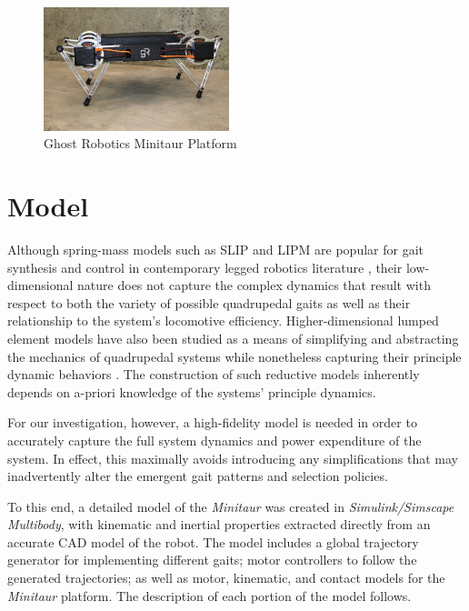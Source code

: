 \documentclass[conference,11pt,letterpaper]{IEEEtran}
\begin{document}
\begin{figure}[ht!]
    \centering
    \includegraphics[width=0.48\textwidth]{grminitaur}
    \caption{Ghost Robotics Minitaur Platform \autocite{grminitaur}}
    \label{fig:grminitaur}
\end{figure}

\section{Model}



Although spring-mass models such as SLIP and LIPM are popular for gait synthesis and control in contemporary legged robotics literature \autocite{albertwuhartmutgeyer2013}, their low-dimensional nature does not capture the complex dynamics that result with respect to both the variety of possible quadrupedal gaits as well as their relationship to the system's locomotive efficiency. Higher-dimensional lumped element models have also been studied as a means of simplifying and abstracting the mechanics of quadrupedal systems while nonetheless capturing their principle dynamic behaviors \autocite{remy2011optimal}. The construction of such reductive models inherently depends on a-priori knowledge of the systems' principle dynamics.

For our investigation, however, a high-fidelity model is needed in order to accurately capture the full system dynamics and power expenditure of the system. In effect, this maximally avoids introducing any simplifications that may inadvertently alter the emergent gait patterns and selection policies.

To this end, a detailed model of the \emph{Minitaur} was created in \emph{Simulink/Simscape Multibody}, with kinematic and inertial properties extracted directly from an accurate CAD model of the robot. The model includes a global trajectory generator for implementing different gaits; motor controllers to follow the generated trajectories; as well as motor, kinematic, and contact models for the \emph{Minitaur} platform. The description of each portion of the model follows.
\end{document}
